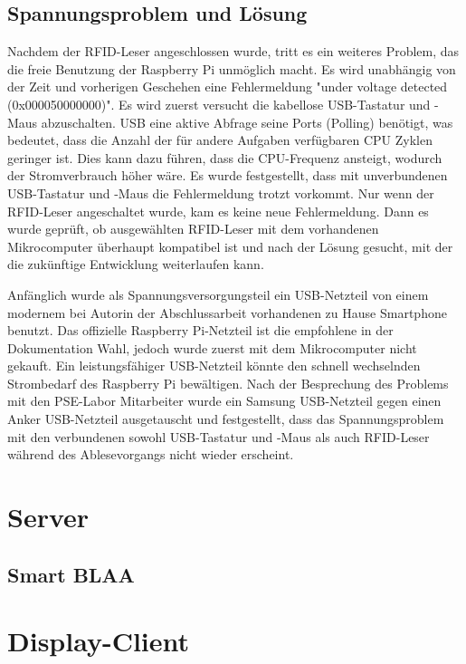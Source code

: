 \subsection{Spannungsproblem und Lösung}
\label{sec:register_client:voltage_issue}
Nachdem der RFID-Leser angeschlossen wurde, tritt es ein weiteres Problem, das die freie Benutzung der Raspberry Pi unmöglich macht. Es wird unabhängig von der Zeit und vorherigen Geschehen eine Fehlermeldung "under voltage detected (0x000050000000)". Es wird zuerst versucht die kabellose USB-Tastatur und -Maus abzuschalten. USB eine aktive Abfrage seine Ports (Polling) benötigt, was bedeutet, dass die Anzahl der für andere Aufgaben verfügbaren CPU Zyklen geringer ist. Dies kann dazu führen, dass die CPU-Frequenz ansteigt, wodurch der Stromverbrauch höher wäre. Es wurde festgestellt, dass mit unverbundenen USB-Tastatur und -Maus die Fehlermeldung trotzt vorkommt. Nur wenn der RFID-Leser angeschaltet wurde, kam es keine neue Fehlermeldung. Dann es wurde geprüft, ob ausgewählten RFID-Leser mit dem vorhandenen Mikrocomputer überhaupt kompatibel ist und nach der Lösung gesucht, mit der die zukünftige Entwicklung weiterlaufen kann.    

Anfänglich wurde als Spannungsversorgungsteil ein USB-Netzteil von einem modernem bei Autorin der Abschlussarbeit vorhandenen zu Hause Smartphone benutzt. Das offizielle Raspberry Pi-Netzteil ist die empfohlene in der Dokumentation Wahl, jedoch wurde zuerst mit dem Mikrocomputer nicht gekauft. Ein leistungsfähiger USB-Netzteil könnte den schnell wechselnden Strombedarf des Raspberry Pi bewältigen. Nach der Besprechung des Problems mit den PSE-Labor Mitarbeiter wurde ein Samsung USB-Netzteil gegen einen Anker USB-Netzteil ausgetauscht und festgestellt, dass das Spannungsproblem mit den verbundenen sowohl USB-Tastatur und -Maus als auch RFID-Leser während des Ablesevorgangs nicht wieder erscheint. 
\section{Server}
\label{sec:server}

\subsection{Smart BLAA}
\label{sec:register_client:smart}

\section{Display-Client}
\label{sec:display_client}
